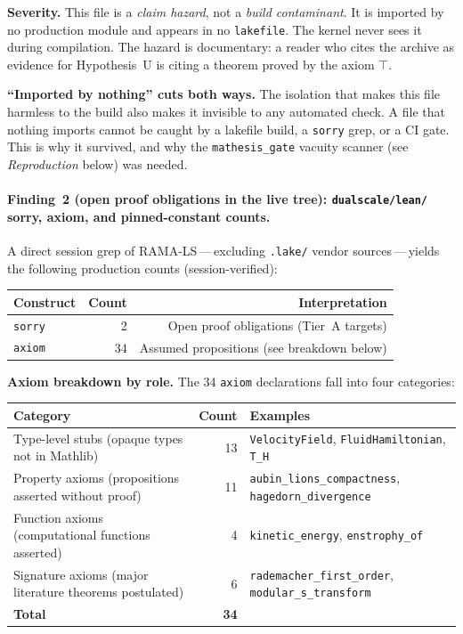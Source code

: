 \documentclass[11pt,a4paper]{article}
\theoremstyle{plain}
\theoremstyle{definition}
\theoremstyle{remark}
\begin{document}
\noindent
\textbf{Severity.}
This file is a \emph{claim hazard}, not a \emph{build contaminant}.
It is imported by no production module and appears in no \texttt{lakefile}.
The kernel never sees it during compilation.
The hazard is documentary: a reader who cites the archive as evidence for
Hypothesis~U is citing a theorem proved by the axiom $\top$.

\noindent
\textbf{``Imported by nothing'' cuts both ways.}
The isolation that makes this file harmless to the build also makes it
invisible to any automated check.
A file that nothing imports cannot be caught by a lakefile build,
a \texttt{sorry} grep, or a CI gate.
This is why it survived, and why the \texttt{mathesis\_gate} vacuity
scanner (see \emph{Reproduction} below) was needed.

\paragraph{Finding~2 (open proof obligations in the live tree):
\texttt{dualscale/lean/} sorry, axiom, and pinned-constant counts.}

A direct session grep of RAMA-LS\,---\,excluding \texttt{.lake/} vendor
sources\,---\,yields the following production counts (session-verified):

\begin{center}
\begin{tabular}{lrr}
\toprule
\textbf{Construct} & \textbf{Count} & \textbf{Interpretation} \\
\midrule
\texttt{sorry}  & 2  & Open proof obligations (Tier~A targets) \\
\texttt{axiom}  & 34 & Assumed propositions (see breakdown below) \\
\bottomrule
\end{tabular}
\end{center}

\noindent
\textbf{Axiom breakdown by role.}
The 34 \texttt{axiom} declarations fall into four categories:

\begin{center}
\begin{tabular}{lrl}
\toprule
\textbf{Category} & \textbf{Count} & \textbf{Examples} \\
\midrule
Type-level stubs (opaque types not in Mathlib) & 13 &
  \texttt{VelocityField}, \texttt{FluidHamiltonian}, \texttt{T\_H} \\
Property axioms (propositions asserted without proof) & 11 &
  \texttt{aubin\_lions\_compactness}, \texttt{hagedorn\_divergence} \\
Function axioms (computational functions asserted) & 4 &
  \texttt{kinetic\_energy}, \texttt{enstrophy\_of} \\
Signature axioms (major literature theorems postulated) & 6 &
  \texttt{rademacher\_first\_order}, \texttt{modular\_s\_transform} \\
\midrule
\textbf{Total} & \textbf{34} & \\
\bottomrule
\end{tabular}
\end{center}
\end{document}
